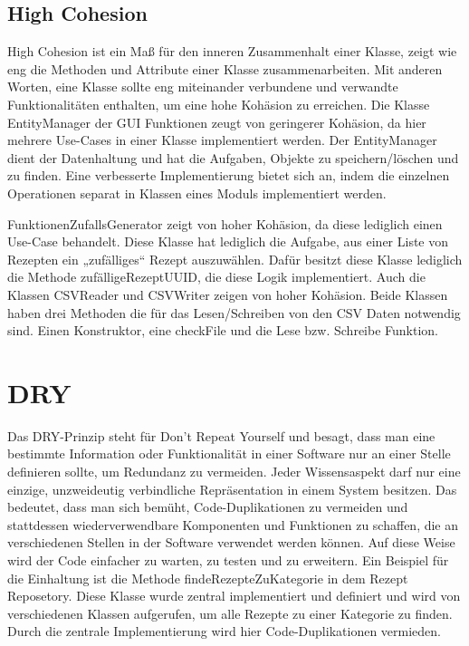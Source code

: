 \subsection{High Cohesion}
High Cohesion  ist ein Maß für den inneren Zusammenhalt einer Klasse, zeigt wie eng die Methoden und Attribute einer Klasse zusammenarbeiten. Mit anderen Worten, eine Klasse sollte eng miteinander verbundene und verwandte Funktionalitäten enthalten, um eine hohe Kohäsion zu erreichen. 
Die Klasse EntityManager der GUI Funktionen zeugt von geringerer Kohäsion, da hier mehrere Use-Cases in einer Klasse implementiert werden. Der EntityManager dient der Datenhaltung und hat die Aufgaben, Objekte zu speichern/löschen und zu finden. Eine verbesserte Implementierung bietet sich an, indem die einzelnen Operationen separat in Klassen eines Moduls implementiert werden.

FunktionenZufallsGenerator zeigt von hoher Kohäsion, da diese lediglich einen Use-Case behandelt. Diese Klasse hat lediglich die Aufgabe, aus einer Liste von Rezepten ein „zufälliges“ Rezept auszuwählen. Dafür besitzt diese Klasse lediglich die Methode zufälligeRezeptUUID, die diese Logik implementiert. Auch die Klassen CSVReader und CSVWriter zeigen von hoher Kohäsion. Beide Klassen haben drei Methoden die für das Lesen/Schreiben von den CSV Daten notwendig sind. Einen Konstruktor, eine checkFile und die Lese bzw. Schreibe Funktion. 

\section{DRY}\label{DRY}
Das DRY-Prinzip steht für \glqq Don't Repeat Yourself \grqq{} und besagt, dass man eine bestimmte Information oder Funktionalität in einer Software nur an einer Stelle definieren sollte, um Redundanz zu vermeiden. Jeder Wissensaspekt darf nur eine einzige, unzweideutig verbindliche Repräsentation in einem
System besitzen. Das bedeutet, dass man sich bemüht, Code-Duplikationen zu vermeiden und stattdessen wiederverwendbare Komponenten und Funktionen zu schaffen, die an verschiedenen Stellen in der Software verwendet werden können. Auf diese Weise wird der Code einfacher zu warten, zu testen und zu erweitern.
Ein Beispiel für die Einhaltung ist die Methode findeRezepteZuKategorie in dem Rezept Reposetory. Diese Klasse wurde zentral implementiert und definiert und wird von verschiedenen Klassen aufgerufen, um alle Rezepte zu einer Kategorie zu finden. Durch die zentrale Implementierung wird hier Code-Duplikationen vermieden. 

